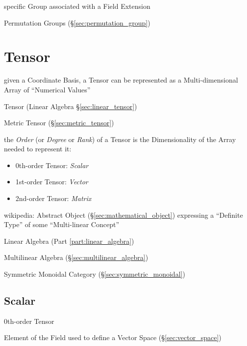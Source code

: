 specific Group associated with a Field Extension %

Permutation Groups (\S\ref{sec:permutation_group})



\section{Tensor}\label{sec:tensor}

given a Coordinate Basis, a Tensor can be represented as a
Multi-dimensional Array of ``Numerical Values'' %


\fist Tensor (Linear Algebra \S\ref{sec:linear_tensor})

\fist Metric Tensor (\S\ref{sec:metric_tensor})

the \emph{Order} (or \emph{Degree} or \emph{Rank}) of a Tensor is the
Dimensionality of the Array needed to represent it:

\begin{itemize}
  \item 0th-order Tensor: \emph{Scalar}
  \item 1st-order Tensor: \emph{Vector}
  \item 2nd-order Tensor: \emph{Matrix}
\end{itemize}

wikipedia: Abstract Object (\S\ref{sec:mathematical_object})
expressing a ``Definite Type'' of some ``Multi-linear Concept''

Linear Algebra (Part \ref{part:linear_algebra})

Multilinear Algebra (\S\ref{sec:multilinear_algebra})

Symmetric Monoidal Category (\S\ref{sec:symmetric_monoidal})



\subsection{Scalar}\label{sec:scalar}

0th-order Tensor

Element of the Field used to define a Vector Space
(\S\ref{sec:vector_space})



